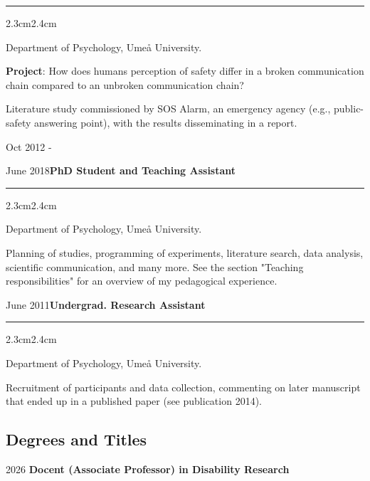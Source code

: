 \documentclass[]{article}
\begin{document}
\hrule
\begin{changemargin}{2.3cm}{2.4cm}

Department of Psychology, Umeå University.

\textbf{Project}: How does humans perception of safety differ in a broken communication chain compared to an unbroken communication chain? 

Literature study commissioned by SOS Alarm, an emergency agency (e.g., public-safety answering point), with the results disseminating in a report.

\end{changemargin}

Oct 2012 -

June
2018\hspace{0.75cm}\textbf{PhD Student and Teaching Assistant}\vspace{1mm}

\hrule
\begin{changemargin}{2.3cm}{2.4cm}

Department of Psychology, Umeå University.

Planning of studies, programming of experiments, literature search, data analysis, scientific communication, and many more. See the section "Teaching responsibilities" for an overview of my pedagogical experience.

\end{changemargin}

June
2011\hspace{0.75cm}\textbf{Undergrad. Research Assistant}\vspace{1mm}

\hrule
\begin{changemargin}{2.3cm}{2.4cm}

Department of Psychology, Umeå University.

Recruitment of participants and data collection, commenting on later manuscript that ended up in a published paper (see publication 2014). 

\end{changemargin}

\newpage

\subsection{Degrees and Titles}\label{degrees-and-titles}

2026 \hspace{1.5cm}
\textbf{Docent (Associate Professor) in Disability Research}
\end{document}
